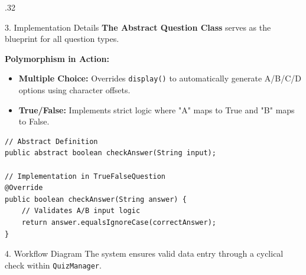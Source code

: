\documentclass[final]{beamer}
\begin{document}
\begin{frame}[t]
\begin{columns}[T]
\begin{column}{.32\paperwidth}
    \begin{block}{3. Implementation Details}
      \textbf{The Abstract Question Class} serves as the blueprint for all question types.
      
      \vspace{0.5em}
      \textbf{Polymorphism in Action:}
      \begin{itemize}
          \item \textbf{Multiple Choice:} Overrides \texttt{display()} to automatically generate A/B/C/D options using character offsets.
          \item \textbf{True/False:} Implements strict logic where "A" maps to True and "B" maps to False.
      \end{itemize}

      \vspace{1em}
      \begin{tcolorbox}[colback=gray!10, title=Code Snippet: Polymorphism]
\begin{verbatim}
// Abstract Definition
public abstract boolean checkAnswer(String input);

// Implementation in TrueFalseQuestion
@Override
public boolean checkAnswer(String answer) {
    // Validates A/B input logic
    return answer.equalsIgnoreCase(correctAnswer);
}
\end{verbatim}
      \end{tcolorbox}
    \end{block}

    \begin{block}{4. Workflow Diagram}
      The system ensures valid data entry through a cyclical check within \texttt{QuizManager}.
      
      \vspace{1cm}
      \begin{center}
      \end{center}
      \vspace{0.5cm}
      

\end{block}
\end{column}
\end{columns}
\end{frame}
\end{document}
